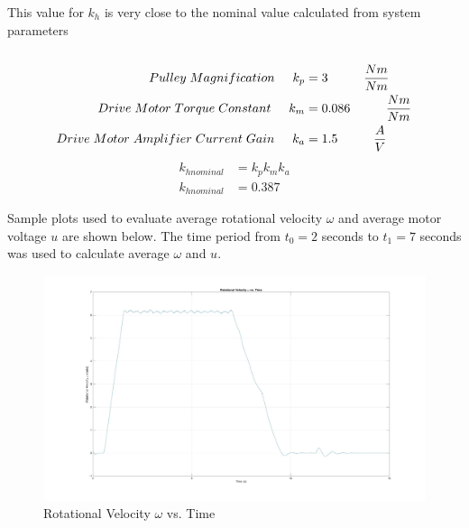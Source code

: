 \documentclass[11pt,titlepage]{article}
\begin{document}
	This value for $k_h$ is very close to the nominal value calculated from system parameters \\\\
	\begin{align*}
		Pulley\hspace{0.1cm}Magnification\hspace{0.5cm}k_p&=3 \hspace{1cm}\frac{Nm}{Nm}\\
		Drive\hspace{0.1cm}Motor\hspace{0.1cm}Torque\hspace{0.1cm}Constant \hspace{0.5cm}k_m&=0.086 \hspace{1cm} \frac{Nm}{Nm}\\
		Drive\hspace{0.1cm}Motor\hspace{0.1cm}Amplifier\hspace{0.1cm}Current\hspace{0.1cm}Gain \hspace{0.5cm}k_a&=1.5\hspace{1cm} \frac{A}{V}
	\end{align*}
	\begin{align*}
		k_{h nominal}&=k_pk_mk_a\\
		k_{h nominal}&=0.387
	\end{align*}

Sample plots used to evaluate average rotational velocity $\omega$ and average motor voltage $u$ are shown below. The time period from $t_0=2$ seconds to $t_1=7$ seconds was used to calculate average $\omega$ and $u$.

	\begin{figure}[h!]
		\centering
		\includegraphics[trim={6cm 0 0 0},clip,angle=0,origin=c,scale=0.2]{w_vs_time}
		\caption{Rotational Velocity $\omega$ vs. Time}
		\label{fig:w_vs_time}
	\end{figure}
\end{document}
